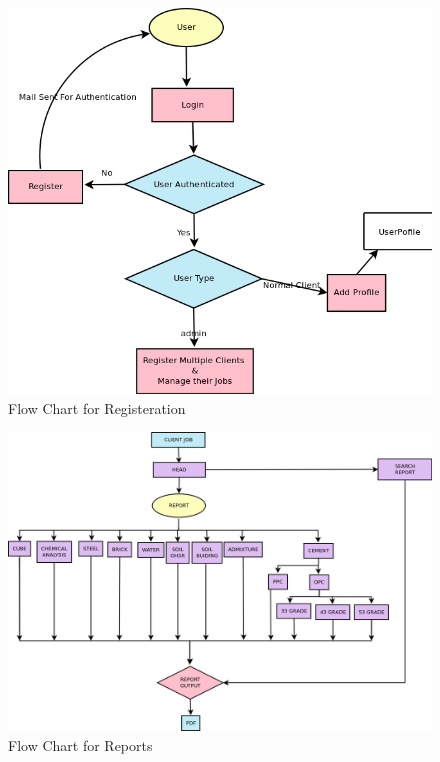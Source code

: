 \newpage
\begin{figure}[h]
\centering \includegraphics[scale=0.8]{images/register.png}
\caption{Flow Chart for Registeration}
\end{figure} 
\newpage
\begin{figure}[h]
\vskip 3cm
\centering \includegraphics[scale=0.45]{images/report.png}
\caption{Flow Chart for Reports}
\end{figure} 
\newpage
